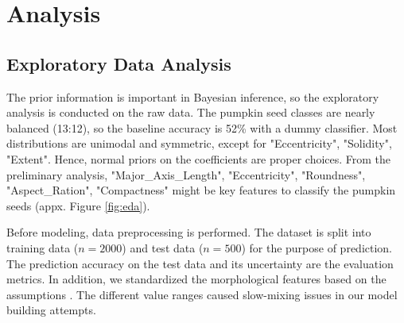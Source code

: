 \documentclass[12pt]{article}
\begin{document}
\section{Analysis}

\subsection{Exploratory Data Analysis}

The prior information is important in Bayesian inference, so the exploratory analysis is conducted on the raw data. The pumpkin seed classes are nearly balanced (13:12), so the baseline accuracy is 52\% with a dummy classifier. Most distributions are unimodal and symmetric, except for "Eccentricity", "Solidity", "Extent". Hence, normal priors on the coefficients are proper choices. From the preliminary analysis, "Major\_Axis\_Length", "Eccentricity", "Roundness", "Aspect\_Ration", "Compactness" might be key features to classify the pumpkin seeds (appx. Figure \ref{fig:eda}).

\noindent Before modeling, data preprocessing is performed. The dataset is split into training data ($n=2000$) and test data ($n=500$) for the purpose of prediction. The prediction accuracy on the test data and its uncertainty are the evaluation metrics. In addition, we standardized the morphological features based on the assumptions \citep{sas}. The different value ranges caused slow-mixing issues in our model building attempts.
\end{document}
